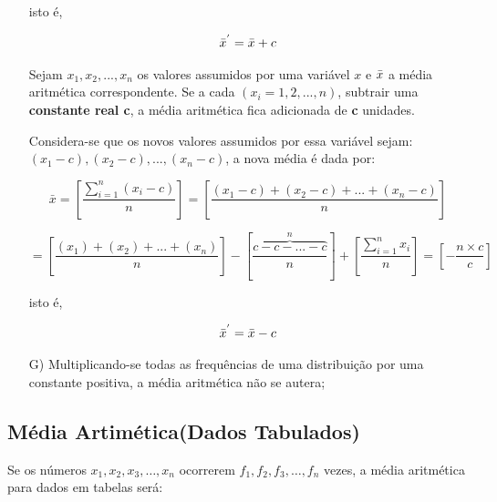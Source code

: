 \begin{enumerate}
isto é, 

$$\Bar{x}^{'}=\Bar{x}+c$$



\vskip0.3cm
\textbf{} 
\vskip0.3cm

Sejam $x_{1}, x_{2},...,x_{n}$ os valores assumidos por uma variável $x$ e $\Bar{x}$ a média aritmética correspondente. Se a cada $(x_{i}=1,2,...,n)$, subtrair uma \textbf{constante real c}, a média aritmética fica adicionada de \textbf{c} unidades.\vskip0.3cm


Considera-se que os novos valores assumidos por essa variável sejam: $(x_{1}-c),(x_{2}-c),...,(x_{n}-c)$, a nova média é dada por:

\begin{equation}\label{media3}
     \bar{x} = \left[ \frac{\sum_{i=1}^{n}(x_{i}-c)}{n} \right] = \left[ \frac{(x_{1}-c)+(x_{2}-c)+...+(x_{n}-c)}{n} \right] 
\end{equation}

\begin{equation*}\label{media4}
  = \left[ \frac{(x_{1})+(x_{2})+...+(x_{n})}{n} \right] - \left[ \overbrace{\frac{c-c-...-c}{n}}^{n} \right] + \left[ \frac{\sum_{i=1}^{n}x_{i}}{n} \right] = \left[ - \frac{n \times c}{c} \right]
\end{equation*}

isto é, 

$$\Bar{x}^{'}=\Bar{x}-c$$




\item [{G)}]Multiplicando-se todas as frequências de uma distribuição por uma constante positiva, a média aritmética não se autera; 
\end{enumerate}















\subsection{Média Artimética(Dados Tabulados)}

Se os números $x_{1},x_{2},x_{3},\ldots, x_{n}$ ocorrerem $f_{1}, f_{2}, f_{3}, \ldots, f_{n}$ vezes, a média aritmética para dados em tabelas será:


